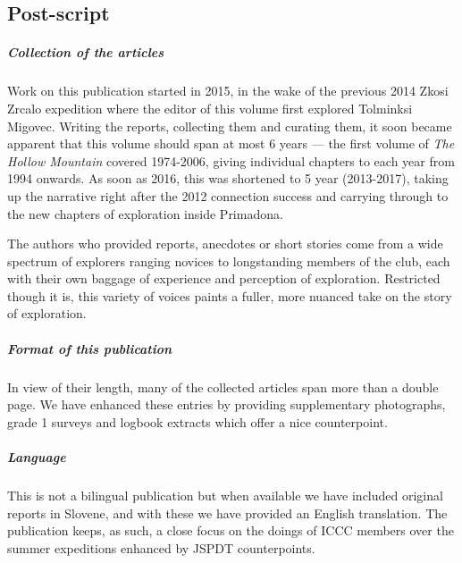 \newpage
 
 \begin{tcolorbox}
 	\begin{fullwidth}
 	\chapter{Post-script}
 		\begin{parcolumns}{2}


 			\paragraph{Collection of the articles}

 			Work on this publication started in 2015, in the wake of the previous 2014 Zkosi Zrcalo expedition where the editor of this volume first explored Tolminksi Migovec. Writing the reports, collecting them and curating them, it soon became apparent that this volume should span at most 6 years --- the first volume of \emph{The Hollow Mountain} covered 1974-2006, giving individual chapters to each year  from 1994 onwards. As soon as 2016, this was shortened to 5 year (2013-2017), taking up the narrative right after the 2012 connection success and carrying through to the new chapters of exploration inside Primadona.


 			The authors who provided reports, anecdotes or short stories come from a wide spectrum of explorers ranging novices to longstanding members of the club, each with their own baggage of experience and perception of exploration. Restricted though it is, this variety of voices paints a fuller, more nuanced take on the story of exploration.

 			\paragraph{Format of this publication}

 			In view of their length, many of the collected articles span more than a double page. We have enhanced these entries by providing supplementary photographs, grade 1 surveys and logbook extracts which offer a nice counterpoint.


 			\paragraph{Language}

 			This is not a bilingual publication but when available we have included original reports in Slovene, and with these we have provided an English translation. The publication keeps, as such, a close focus on the doings of ICCC members over the summer expeditions enhanced by JSPDT counterpoints. 



\end{parcolumns}
\end{fullwidth}
\end{tcolorbox}
